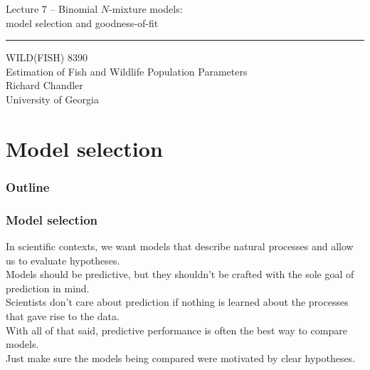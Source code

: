 \documentclass[color=usenames,dvipsnames]{beamer}\usepackage[]{graphicx}\usepackage[]{color}
\begin{document}
\begin{frame}[plain]
  \LARGE
  \centering
  {\LARGE Lecture 7 -- Binomial $N$-mixture models: \\
    model selection and goodness-of-fit} \\  
  {\color{default} \rule{\textwidth}{0.1pt}}
  \vfill
  \large
  WILD(FISH) 8390 \\
  Estimation of Fish and Wildlife Population Parameters \\
  \vfill
  \large
  Richard Chandler \\
  University of Georgia \\
\end{frame}





\section{Model selection}



\begin{frame}[plain]
  \frametitle{Outline}
  \Large
\end{frame}





\begin{frame}
  \frametitle{Model selection}
  In scientific contexts, we want models that describe natural
  processes and allow us to evaluate hypotheses. \\
  \pause
  \vfill
  Models should be predictive, but they shouldn't be crafted with the
  sole goal of prediction in mind. \\
  \pause
  \vfill
  Scientists don't care about prediction if nothing is learned
  about the processes that gave rise to the data. \\
  \pause
  \vfill
  With all of that said, predictive performance is often the best way
  to compare models. \\
  \pause
  \vfill
  Just make sure the models being compared were motivated by clear
  hypotheses.
\end{frame}
\end{document}
